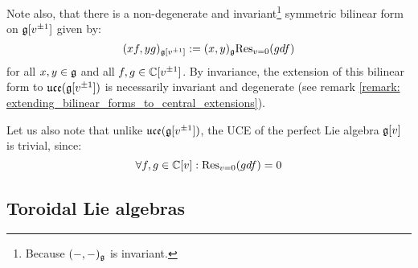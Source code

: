 \begin{example}
            Note also, that there is a non-degenerate and invariant\footnote{Because $(-, -)_{\mathfrak{g}}$ is invariant.} symmetric bilinear form on $\mathfrak{g}[v^{\pm 1}]$ given by:
                $$(xf, yg)_{\mathfrak{g}[v^{\pm 1}]} := (x, y)_{\mathfrak{g}} \mathrm{Res}_{v = 0}(g df)$$
            for all $x, y \in \mathfrak{g}$ and all $f, g \in \mathbb{C}[v^{\pm 1}]$. By invariance, the extension of this bilinear form to $\mathfrak{uce}(\mathfrak{g}[v^{\pm 1}])$ is necessarily invariant and degenerate (see remark \ref{remark: extending_bilinear_forms_to_central_extensions}).

            Let us also note that unlike $\mathfrak{uce}(\mathfrak{g}[v^{\pm 1}])$, the UCE of the perfect Lie algebra $\mathfrak{g}[v]$ is trivial, since:
                $$\forall f, g \in \mathbb{C}[v]: \mathrm{Res}_{v = 0}(g df) = 0$$
        \end{example}

    \subsection{Toroidal Lie algebras}
